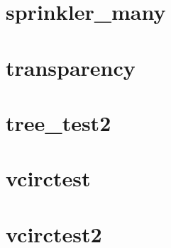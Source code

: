 \documentclass[11pt,twoside]{book}
\begin{document}
\section{sprinkler\_many}
\label{SSFspinklermany}

\section{transparency}
\label{SSFtransparency}

\section{tree\_test2}

\section{vcirctest}

\section{vcirctest2}
\end{document}

